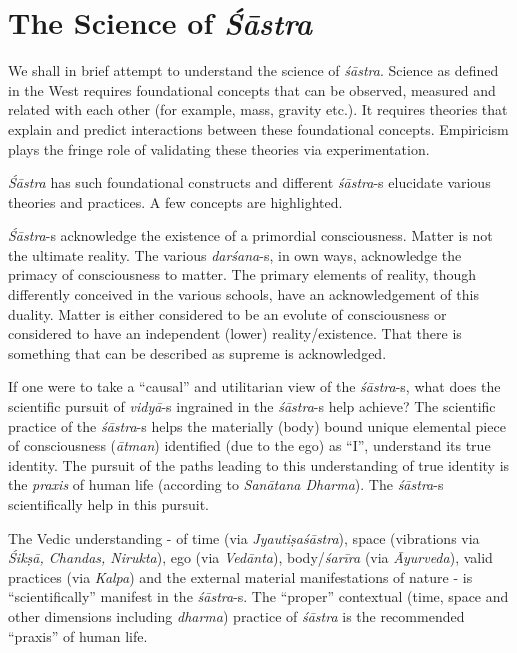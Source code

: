 \section*{The Science of \textit{Śāstra}}

We shall in brief attempt to understand the science of \textit{śāstra}. Science as defined in the West requires foundational concepts that can be observed, measured and related with each other (for example, mass, gravity etc.). It requires theories that explain and predict interactions between these foundational concepts. Empiricism plays the fringe role of validating these theories via experimentation.

\textit{Śāstra} has such foundational constructs and different \textit{śāstra}-s elucidate various theories and practices. A few concepts are highlighted.

\textit{Śāstra}-s acknowledge the existence of a primordial consciousness. Matter is not the ultimate reality. The various \textit{darśana}-s, in own ways, acknowledge the primacy of consciousness to matter. The primary elements of reality, though differently conceived in the various schools, have an acknowledgement of this duality. Matter is either considered to be an evolute of consciousness or considered to have an independent (lower) reality/existence. That there is something that can be described as supreme is acknowledged.

If one were to take a “causal” and utilitarian view of the \textit{śāstra}-s, what does the scientific pursuit of \textit{vidyā}-s ingrained in the \textit{śāstra}-s help achieve? The scientific practice of the \textit{śāstra}-s helps the materially (body) bound unique elemental piece of consciousness (\textit{ātman}) identified (due to the ego) as “I”, understand its true identity. The pursuit of the paths leading to this understanding of true identity is the \textit{praxis} of human life (according to \textit{Sanātana Dharma}). The \textit{śāstra}-s scientifically help in this pursuit. 

The Vedic understanding - of time (via \textit{Jyautiṣaśāstra}), space (vibrations via \textit{Śikṣā, Chandas, Nirukta}), ego (via \textit{Vedānta}), body/\textit{śarīra} (via \textit{Āyurveda}), valid practices (via \textit{Kalpa}) and the external material manifestations of nature - is “scientifically” manifest in the \textit{śāstra}-s. The “proper” contextual (time, space and other dimensions including \textit{dharma}) practice of \textit{śāstra} is the recommended “praxis” of human life.

